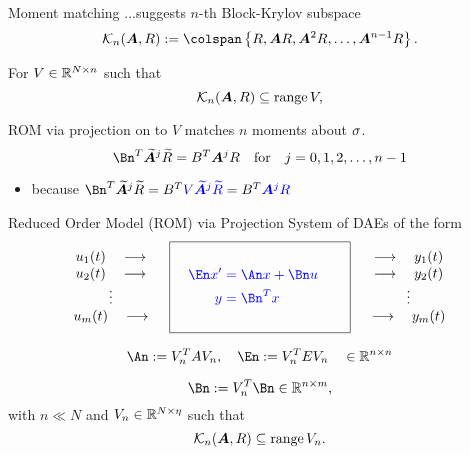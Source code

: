 \documentclass{beamer}
\newcommand{\Balert}[1]{\textcolor{blue}{#1}}
\begin{document}
 
 
 
\begin{frame}{Moment matching}{}
...suggests \alert{$n$-th Block-Krylov subspace}
\[ 
  \krylov{n}{\A}{R}:= \colspan\left\{R,\A R,\A^2R,\ldots,\A^{n-1}R\right\}.
\]

For $V\in\mathbb{R}^{N\times n}$ such that
 \[  \mathcal{K}_{n}({\bm{A}},{R}) \subseteq \text{range}\,V, \]
 	
ROM via projection on to $V$ matches $n$ moments about $\sigma$.
\[
\Bn^T\widetilde{\A}^j \widetilde{R} = B^T\A^j R\quad\text{for}\quad j=0,1,2,\ldots,n-1
\]
\begin{itemize}
\item because $\Bn^T \widetilde{\A}^j \widetilde{R} 
= B^T \Balert{V \widetilde{\A}^j \widetilde{R}} = B^T\Balert{\A^j R }$  
\end{itemize}
\end{frame}


\begin{frame}{Reduced Order Model (ROM) via Projection}
   System of DAEs of the form
   \begin{equation*}  
   \begin{array}{c}
   u_1(t)\quad\longrightarrow \\ u_2(t)\quad\longrightarrow\\ \vdots\\u_\nin(t)\quad\longrightarrow
   \end{array}
  \quad
  \boxed{\Balert{%
 	    \begin{aligned}
 	    \\
 			\quad \En x' &=  \An x + \Bn u\quad\\
 			y &= \Bn^Tx\\
 			\\
 		\end{aligned}	
      }
  	}
  \quad	
		 \begin{array}{c}
	 \longrightarrow\quad y_1(t)\\ \longrightarrow\quad y_2(t)\\ \vdots\\\longrightarrow\quad y_\nin(t)
   \end{array} 
 \end{equation*}
 
 \[
 	\An := V_n^TAV_n, \quad \En := V_n^TEV_n \quad\in \R^{n\times n}
 \]
 
 \[
 	\Bn := V_n^T\Bn \in\R^{n\times \nin},
 \]
with $n \ll N$ and $V_n\in\mathbb{R}^{N\times \eta}$ such that 
 \[  \mathcal{K}_{n}({\bm{A}},{R}) \subseteq \text{range}\,V_n. \]
\end{frame}
\end{document}
